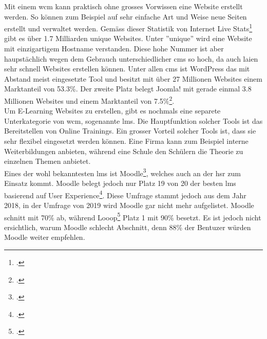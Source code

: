 Mit einem \gls{wcm} kann praktisch ohne grosses Vorwissen eine Website erstellt werden. So können zum Beispiel auf sehr einfache Art und Weise neue Seiten erstellt und verwaltet werden. Gemäss dieser Statistik von Internet Live Stats\footcite{internet_live_stats} gibt es über 1.7 Milliarden unique Websites. Unter ''unique'' wird eine Website mit einzigartigem Hostname verstanden. Diese hohe Nummer ist aber haupstächlich wegen dem Gebrauch unterschiedlicher \gls{cms} so hoch, da auch laien sehr schnell Websites erstellen können. Unter allen \gls{cms} ist WordPress das mit Abstand meist eingesetzte Tool und besitzt mit über 27 Millionen Websites einem Marktanteil von 53.3\%. Der zweite Platz belegt Joomla! mit gerade einmal 3.8 Millionen Websites und einem Marktanteil von 7.5\%\footcite{cms_market_share}.\\

Um E-Learning Websites zu erstellen, gibt es nochmals eine separete Unterkategorie von \gls{wcm}, sogenannte \gls{lms}. Die Hauptfunktion solcher Tools ist das Bereitstellen von Online Trainings. Ein grosser Vorteil solcher Tools ist, dass sie sehr flexibel eingesetzt werden können. Eine Firma kann zum Beispiel interne Weiterbildungen anbieten, während eine Schule den Schülern die Theorie zu einzelnen Themen anbietet. \\

Eines der wohl bekanntesten \gls{lms} ist Moodle\footcite{moodle_homepage}, welches auch an der \gls{hsr} zum Einsatz kommt. Moodle belegt jedoch nur Platz 19 von 20 der besten \gls{lms} basierend auf User Experience\footcite{moodle_ux}. Diese Umfrage stammt jedoch aus dem Jahr 2018, in der Umfrage von 2019 wird Moodle gar nicht mehr aufgelistet. Moodle schnitt mit 70\% ab, während Looop\footcite{looop_homepage} Platz 1 mit 90\% besetzt. Es ist jedoch nicht ersichtlich, warum Moodle schlecht Abschnitt, denn 88\% der Bentuzer würden Moodle weiter empfehlen.


%
%
%

